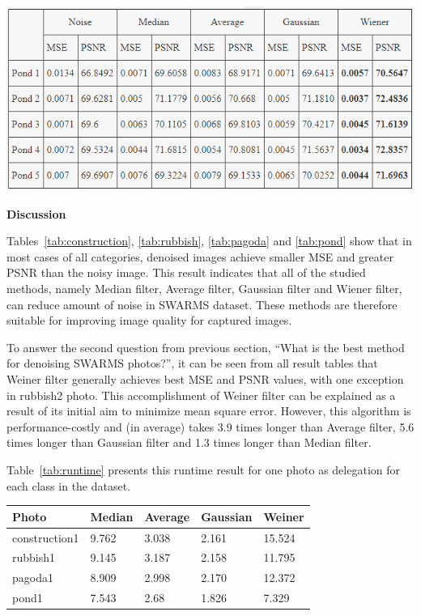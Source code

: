 \begin{center}


	\includegraphics[width=15cm]{images/Pond.png}
\end{center}

\newpage

\setlength{\parskip}{0.5em}
\setlength\parindent{24pt}

\textbf{Discussion}

Tables~\ref{tab:construction}, \ref{tab:rubbish}, \ref{tab:pagoda} and \ref{tab:pond} show that in most cases of all categories, denoised images achieve smaller MSE and greater PSNR than the noisy image. This result indicates that all of the studied methods, namely Median filter, Average filter, Gaussian filter and Wiener filter, can reduce amount of noise in SWARMS dataset. These methods are therefore suitable for improving image quality for captured images.

To answer the second question from previous section, ``What is the best method for denoising SWARMS photos?'', it can be seen from all result tables that Weiner filter generally achieves best MSE and PSNR values, with one exception in rubbish2 photo. This accomplishment of Weiner filter can be explained as a result of its initial aim to minimize mean square error. However, this algorithm is performance-costly and (in average) takes 3.9 times longer than Average filter, 5.6 times longer than Gaussian filter and 1.3 times longer than Median filter.

Table~\ref{tab:runtime} presents this runtime result for one photo as delegation for each class in the dataset.

\begin{center}
	\begin{tabular}{| l | l | l | l | l |}
		\hline
		Photo 			& Median 	& Average 	& Gaussian 	& Weiner 	\\ \hline
		construction1	& 9.762		& 3.038		& 2.161		& 15.524	\\ \hline
		rubbish1		& 9.145		& 3.187		& 2.158		& 11.795	\\ \hline
		pagoda1			& 8.909		& 2.998		& 2.170		& 12.372	\\ \hline
		pond1			& 7.543		& 2.68		& 1.826		& 7.329		\\ \hline
	\end{tabular}
	\label{tab:runtime}
\end{center}